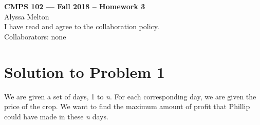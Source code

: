 \documentclass[11pt]{article}
\begin{document}
	
	\begin{center}
		{\bf\Large CMPS 102 --- Fall 2018 --  Homework 3}\\
		Alyssa Melton\\
		I have read and agree to the collaboration policy. \\
		Collaborators: none\\
	\end{center}
	
	
	\section*{Solution to Problem 1}
		We are given a set of days, 1 to \textit{n}. 
		For each corresponding day, we are given the price of the crop. 
		We want to find the maximum amount of profit that Phillip could have made in these \textit{n} days.
		
\end{document}

